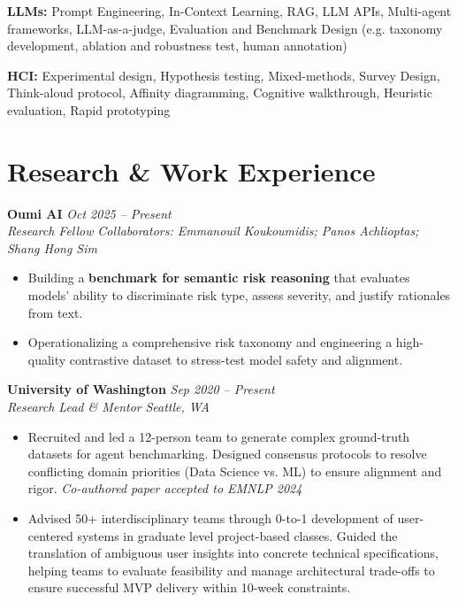 \documentclass[10pt,a4paper]{article}
\newcommand{\experience}[4]{%
  \vspace{6pt}%
  \noindent\textbf{#1} \hfill \textit{\small #2}\\
  \textit{#3} \hfill \textit{\small #4}
}
\newcommand{\skill}[2]{%
  \vspace{4pt}
  \textbf{#1: }#2
}
\begin{document}
\skill{LLMs}{Prompt Engineering, In-Context Learning, RAG, LLM APIs, Multi-agent frameworks, LLM-as-a-judge, Evaluation and Benchmark Design (e.g. taxonomy development, ablation and robustness test, human annotation)}

\skill{HCI}{Experimental design, Hypothesis testing, Mixed-methods, Survey Design, Think-aloud protocol, Affinity diagramming, Cognitive walkthrough, Heuristic evaluation, Rapid prototyping}



\section{Research \& Work Experience}

\experience{Oumi AI}{Oct 2025 -- Present}{Research Fellow}{Collaborators: Emmanouil Koukoumidis; Panos Achlioptas; Shang Hong Sim}
\begin{itemize}
  \item Building a \textbf{benchmark for semantic risk reasoning} that evaluates models’ ability to discriminate risk type, assess severity, and justify rationales from text.
  \item Operationalizing a comprehensive risk taxonomy and engineering a high-quality contrastive dataset to stress-test model safety and alignment.
\end{itemize}

\experience{University of Washington}{Sep 2020 -- Present}{Research Lead \& Mentor}{Seattle, WA}
\begin{itemize}

  \item Recruited and led a 12-person team to generate complex ground-truth datasets for agent benchmarking. Designed consensus protocols to resolve conflicting domain priorities (Data Science vs. ML) to ensure alignment and rigor. \textcolor{tagpink}{\textit{Co-authored paper accepted to EMNLP 2024}}
  
  \item Advised 50+ interdisciplinary teams through 0-to-1 development of user-centered systems in graduate level project-based classes. Guided the translation of ambiguous user insights into concrete technical specifications, helping teams to evaluate feasibility and manage architectural trade-offs to ensure successful MVP delivery within 10-week constraints.
\end{itemize}
\end{document}
